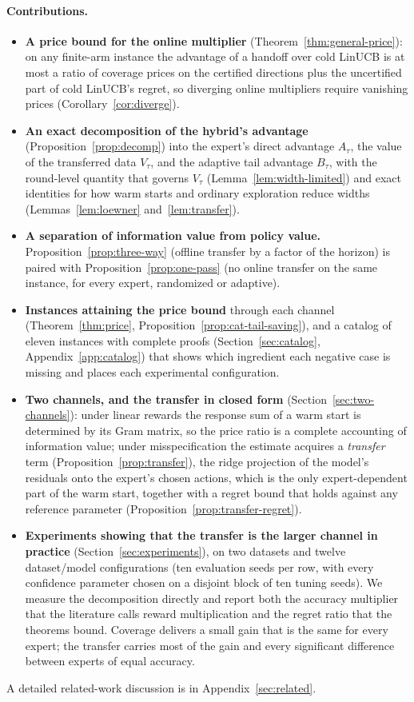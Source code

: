\documentclass{article}
\theoremstyle{definition}
\theoremstyle{remark}
\theoremstyle{remark}
\begin{document}
\paragraph{Contributions.}
\begin{itemize}[itemsep=1pt, topsep=1pt, leftmargin=*]
\item \textbf{A price bound for the online multiplier}
(Theorem~\ref{thm:general-price}): on any finite-arm instance the advantage
of a handoff over cold LinUCB is at most a ratio of coverage prices on the
certified directions plus the uncertified part of cold LinUCB's regret, so
diverging online multipliers require vanishing prices
(Corollary~\ref{cor:diverge}).
\item \textbf{An exact decomposition of the hybrid's advantage}
(Proposition~\ref{prop:decomp}) into the expert's direct advantage $A_\tau$,
the value of the transferred data $V_\tau$, and the adaptive tail advantage
$B_\tau$, with the round-level quantity that governs $V_\tau$
(Lemma~\ref{lem:width-limited}) and exact identities for how warm starts and
ordinary exploration reduce widths (Lemmas~\ref{lem:loewner}
and~\ref{lem:transfer}).
\item \textbf{A separation of information value from policy value.}
Proposition~\ref{prop:three-way} (offline transfer by a factor of the
horizon) is paired with Proposition~\ref{prop:one-pass} (no online transfer
on the same instance, for every expert, randomized or adaptive).
\item \textbf{Instances attaining the price bound} through each channel
(Theorem~\ref{thm:price}, Proposition~\ref{prop:cat-tail-saving}), and a
catalog of eleven instances with complete proofs (Section~\ref{sec:catalog},
Appendix~\ref{app:catalog}) that shows which ingredient each negative case is
missing and places each experimental configuration.
\item \textbf{Two channels, and the transfer in closed form}
(Section~\ref{sec:two-channels}): under linear rewards the response sum of a
warm start is determined by its Gram matrix, so the price ratio is a complete
accounting of information value; under misspecification the estimate acquires
a \emph{transfer} term (Proposition~\ref{prop:transfer}), the ridge
projection of the model's residuals onto the expert's chosen actions, which is
the only expert-dependent part of the warm start, together with a regret bound
that holds against any reference parameter
(Proposition~\ref{prop:transfer-regret}).
\item \textbf{Experiments showing that the transfer is the larger channel in
practice} (Section~\ref{sec:experiments}), on two datasets and twelve
dataset/model configurations (ten evaluation seeds per row, with every
confidence parameter chosen on a disjoint block of ten tuning seeds). We measure the decomposition directly and report both the accuracy
multiplier that the literature calls reward multiplication and the regret
ratio that the theorems bound. Coverage delivers a small gain that is the same
for every expert; the transfer carries most of the gain and every significant
difference between experts of equal accuracy.
\end{itemize}
A detailed related-work discussion is in Appendix~\ref{sec:related}.
\end{document}
